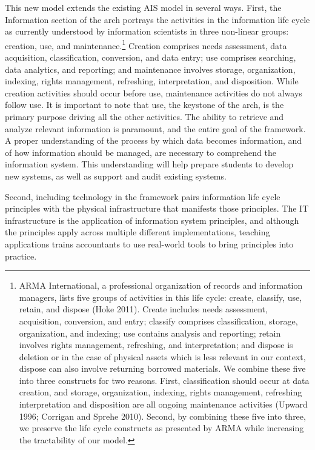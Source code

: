 \documentclass[12pt]{article}
\begin{document}
This new model extends the existing AIS model in several ways. First, the Information section of the arch portrays the activities in the information life cycle as currently understood by information scientists in three non-linear groups: creation, use, and maintenance.\footnote{ARMA International, a professional organization of records and information managers, lists five groups of activities in this life cycle: create, classify, use, retain, and dispose (Hoke 2011). Create includes needs assessment, acquisition, conversion, and entry; classify comprises classification, storage, organization, and indexing; use contains analysis and reporting; retain involves rights management, refreshing, and interpretation; and dispose is deletion or in the case of physical assets which is less relevant in our context, dispose can also involve returning borrowed materials. We combine these five into three constructs for two reasons. First, classification should occur at data creation, and storage, organization, indexing, rights management, refreshing interpretation and disposition are all ongoing maintenance activities (Upward 1996; Corrigan and Sprehe 2010). Second, by combining these five into three, we preserve the life cycle constructs as presented by ARMA while increasing the tractability of our model.} Creation comprises needs assessment, data acquisition, classification, conversion, and data entry; use comprises searching, data analytics, and reporting; and maintenance involves storage, organization, indexing, rights management, refreshing, interpretation, and disposition. While creation activities should occur before use, maintenance activities do not always follow use. It is important to note that use, the keystone of the arch, is the primary purpose driving all the other activities. The ability to retrieve and analyze relevant information is paramount, and the entire goal of the framework. A proper understanding of the process by which data becomes information, and of how information should be managed, are necessary to comprehend the information system. This understanding will help prepare students to develop new systems, as well as support and audit existing systems.

Second, including technology in the framework pairs information life cycle principles with the physical infrastructure that manifests those principles. The IT infrastructure is the application of information system principles, and although the principles apply across multiple different implementations, teaching applications trains accountants to use real-world tools to bring principles into practice.
\end{document}
